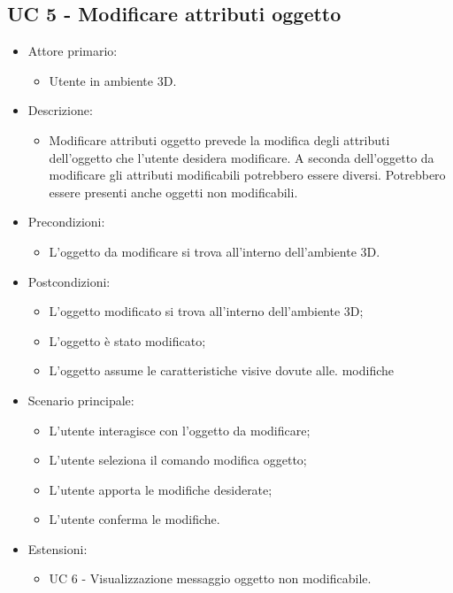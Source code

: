 \subsection{UC 5 - Modificare attributi oggetto}
\begin{itemize}

	\item Attore primario: 
	\begin{itemize}
		\item Utente in ambiente 3D.
	\end{itemize}
	\item Descrizione:
	\begin{itemize}
		\item Modificare attributi oggetto prevede la modifica degli attributi dell'oggetto che l'utente desidera modificare.
\newline A seconda dell'oggetto da modificare gli attributi modificabili potrebbero essere diversi.
\newline Potrebbero essere presenti anche oggetti non modificabili.
	\end{itemize}
	
	\item Precondizioni:
	\begin{itemize}
		\item L'oggetto da modificare si trova all'interno dell'ambiente 3D.
	\end{itemize}
	
	\item Postcondizioni:
	\begin{itemize}
		\item L'oggetto modificato si trova all'interno dell'ambiente 3D;
		\item L'oggetto è stato modificato;
		\item L'oggetto assume le caratteristiche visive dovute alle. modifiche
	\end{itemize}
	
	\item Scenario principale:
	\begin{itemize}
		\item L'utente interagisce con l'oggetto da modificare;
		\item L'utente seleziona il comando modifica oggetto;
		\item L'utente apporta le modifiche desiderate;
		\item L'utente conferma le modifiche.
	\end{itemize}
	
	\item Estensioni:
	\begin{itemize}
		\item UC 6 - Visualizzazione messaggio oggetto non modificabile.
	\end{itemize}
	
\end{itemize}

